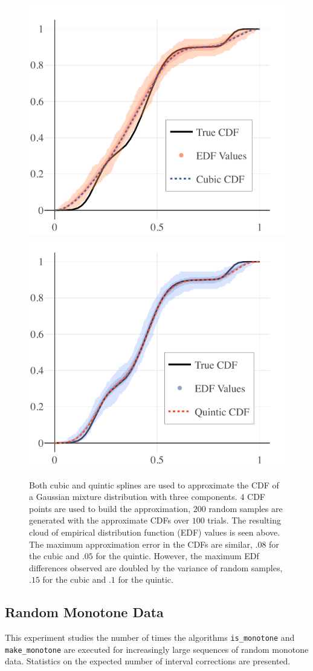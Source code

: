 \documentclass{scspaperproc}
\theoremstyle{scsthe}
\begin{document}
\begin{figure}
  \centering
  \includegraphics[width=.4\textwidth]{experiment_2_cubic_dist}
  \includegraphics[width=.4\textwidth]{experiment_2_quintic_dist}
  \caption{Both cubic and quintic splines are used to approximate the CDF of a Gaussian mixture distribution with three components. $4$ CDF points are used to build the approximation, $200$ random samples are generated with the approximate CDFs over $100$ trials. The resulting cloud of empirical distribution function (EDF) values is seen above. The maximum approximation error in the CDFs are similar, $.08$ for the cubic and $.05$ for the quintic. However, the maximum EDf differences observed are doubled by the variance of random samples, $.15$ for the cubic and $.1$ for the quintic.}
  \label{fig:experiment_2_results}
\end{figure}



\subsection{Random Monotone Data}

This experiment studies the number of times the algorithms \texttt{is\_monotone} and \texttt{make\_monotone} are executed for increasingly large sequences of random monotone data. Statistics on the expected number of interval corrections are presented.
\end{document}
